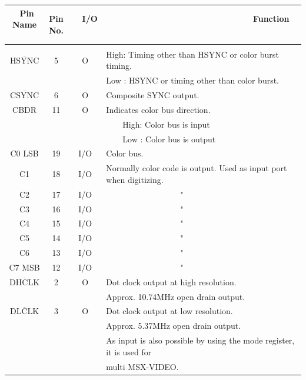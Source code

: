 \documentclass[a4paper,10pt]{article}
\begin{document}
\newpage

\fontsize{10pt}{10pt}\selectfont
\setlength{\arrayrulewidth}{0.1em}
\setlength{\tabcolsep}{0.5em}
\renewcommand{\arraystretch}{1.4}
\noindent \begin{tabular}{|c|c|c|l|}
\hline
\ Pin Name \ & Pin No. & \ \ I/O \ \ & \ \ \ \ \ \ \ \ \ \ \ \ \ \ \ \ \ \ \ \ \ \ \ \ \ \ \ \ \ \ \ Function \ \ \ \ \ \ \ \ \ \ \ \ \ \ \ \ \ \ \ \ \ \ \ \ \ \ \ \ \ \ \ \\
\hline \\[-2.8em]
$\overline{\mbox{HSYNC}}$ & 5 & O & High: Timing other than HSYNC or color burst timing.\\[-1.04em]
& & & Low : HSYNC or timing other than color burst.\\[-1.04em]
$\overline{\mbox{CSYNC}}$ & 6 & O & Composite SYNC output.\\[-1.04em]
CBDR & 11 & O & Indicates color bus direction.\\[-1.04em]
& & & \ \ \ \ High: Color bus is input\\[-1.04em]
& & & \ \ \ \ Low : Color bus is output\\[-1.04em]
C0 LSB & 19 & I/O & Color bus.\\[-1.04em]
C1 & 18 & I/O & Normally color code is output. Used as input port when digitizing.\\[-1.04em]
C2 & 17 & I/O & \ \ \ \ \ \ \ \ \ \ \ \ \ \ \ \ \ \ "\\[-1.04em]
C3 & 16 & I/O & \ \ \ \ \ \ \ \ \ \ \ \ \ \ \ \ \ \ "\\[-1.04em]
C4 & 15 & I/O & \ \ \ \ \ \ \ \ \ \ \ \ \ \ \ \ \ \ "\\[-1.04em]
C5 & 14 & I/O & \ \ \ \ \ \ \ \ \ \ \ \ \ \ \ \ \ \ "\\[-1.04em]
C6 & 13 & I/O & \ \ \ \ \ \ \ \ \ \ \ \ \ \ \ \ \ \ "\\[-1.04em]
C7 MSB & 12 & I/O & \ \ \ \ \ \ \ \ \ \ \ \ \ \ \ \ \ \ "\\[-1.04em]
$\overline{\mbox{DHCLK}}$ & 2 & O & Dot clock output at high resolution.\\[-1.04em]
& & & Approx. 10.74MHz open drain output.\\[-1.04em]
$\overline{\mbox{DLCLK}}$ & 3 & O & Dot clock output at low resolution.\\[-1.04em]
& & & Approx. 5.37MHz open drain output.\\[-1.04em]
& & & As input is also possible by using the mode register, it is used for\\[-1.04em]
& & & multi MSX-VIDEO.\\[-1.04em]

\end{tabular}
\end{document}
